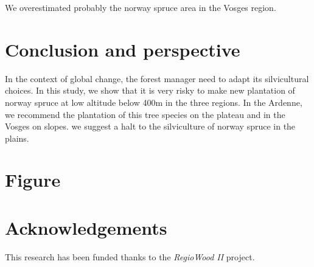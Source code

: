 \documentclass[3p,procedia]{elsarticle}
\begin{document}
We overestimated probably the norway spruce area in the Vosges region.
\section{Conclusion and perspective}

In the context of global change, the forest manager need to adapt its silvicultural choices.
In this study, we show that it is very risky to make new plantation of norway spruce at low altitude below 400m in the three regions.
In the Ardenne, we recommend the plantation of this tree species on the plateau and in the Vosges on slopes. 
we suggest a halt to the silviculture of norway spruce in the plains.
\section{Figure}


	


\section{Acknowledgements}

This research has been funded thanks to the \textit{RegioWood II} project.

%

\end{document}
